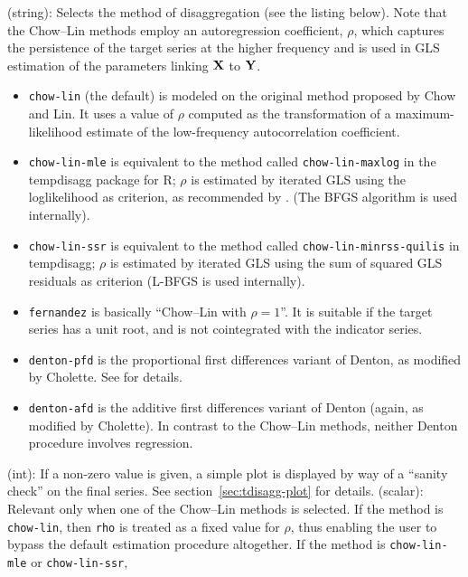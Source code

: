 \begin{description}
\begin{description}
    \tditem[method](string): Selects the method of disaggregation (see
    the listing below). Note that the Chow--Lin methods employ an
    autoregression coefficient, $\rho$, which captures the persistence
    of the target series at the higher frequency and is used in GLS
    estimation of the parameters linking $\mathbf{X}$ to $\mathbf{Y}$.
    \begin{itemize}
    \item \texttt{chow-lin} (the default) is modeled on the original
      method proposed by Chow and Lin. It uses a value of $\rho$
      computed as the transformation of a maximum-likelihood estimate
      of the low-frequency autocorrelation coefficient.
    \item \texttt{chow-lin-mle} is equivalent to the method called
      \texttt{chow-lin-maxlog} in the \textsf{tempdisagg} package for
      \textsf{R}; $\rho$ is estimated by iterated GLS using the
      loglikelihood as criterion, as recommended by
      \cite{bournay79}. (The BFGS algorithm is used internally).
    \item \texttt{chow-lin-ssr} is equivalent to the method called
      \texttt{chow-lin-minrss-quilis} in \textsf{tempdisagg}; $\rho$
      is estimated by iterated GLS using the sum of squared GLS
      residuals as criterion (L-BFGS is used internally).
    \item \texttt{fernandez} is basically ``Chow--Lin with
      $\rho = 1$''. It is suitable if the target series has a unit
      root, and is not cointegrated with the indicator series.
    \item \texttt{denton-pfd} is the proportional first differences
      variant of Denton, as modified by Cholette. See
      \cite{difonzo2012} for details.
    \item \texttt{denton-afd} is the additive first differences
      variant of Denton (again, as modified by Cholette). In
      contrast to the Chow--Lin methods, neither Denton procedure
      involves regression.
    \end{itemize}
  \tditem[plot](int): If a non-zero value is given, a simple
    plot is displayed by way of a ``sanity check'' on the final
    series. See section~\ref{sec:tdisagg-plot} for details.
  \tditem[rho](scalar): Relevant only when one of the Chow--Lin
    methods is selected. If the method is \texttt{chow-lin}, then
    \texttt{rho} is treated as a fixed value for $\rho$, thus enabling
    the user to bypass the default estimation procedure altogether.
    If the method is \texttt{chow-lin-mle} or \texttt{chow-lin-ssr},

\end{description}
\end{description}
